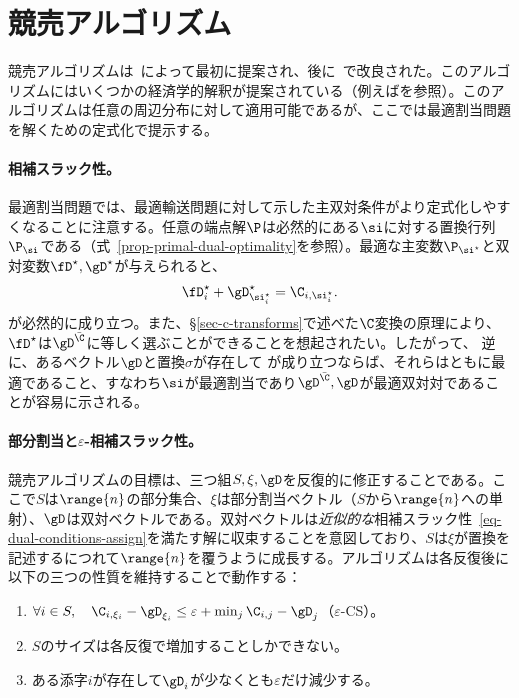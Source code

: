 \section{競売アルゴリズム}\label{s-auction}
競売アルゴリズムは~\citet{bertsekas1981new}によって最初に提案され、後に~\citep{bertsekas1988dual}で改良された。このアルゴリズムにはいくつかの経済学的解釈が提案されている（例えば\citet{bertsekas1992auction}を参照）。このアルゴリズムは任意の周辺分布に対して適用可能であるが、ここでは最適割当問題を解くための定式化で提示する。

\paragraph{相補スラック性。} 最適割当問題では、最適輸送問題に対して示した主双対条件がより定式化しやすくなることに注意する。任意の端点解$\P$は必然的にある$\si$に対する置換行列$\P_\si$である（式~\eqref{prop-primal-dual-optimality}を参照）。最適な主変数$\P_{\si^\star}$と双対変数$\fD^\star,\gD^\star$が与えられると、
$$
\fD^\star_i + \gD^\star_{\si^\star_i} = \C_{i,{\si_i^\star}}.
$$
が必然的に成り立つ。また、\S\ref{sec-c-transforms}で述べた$\C$変換の原理により、$\fD^\star$は$\gD^{\bar\C}$に等しく選ぶことができることを想起されたい。したがって、
逆に、あるベクトル$\gD$と置換$\sigma$が存在して
が成り立つならば、それらはともに最適であること、すなわち$\si$が最適割当であり$\gD^{\bar\C},\gD$が最適双対対であることが容易に示される。


\paragraph{部分割当と$\varepsilon$-相補スラック性。} 競売アルゴリズムの目標は、三つ組$S,\xi,\gD$を反復的に修正することである。ここで$S$は$\range{n}$の部分集合、$\xi$は部分割当ベクトル（$S$から$\range{n}$への単射）、$\gD$は双対ベクトルである。双対ベクトルは\emph{近似的な}相補スラック性~\eqref{eq-dual-conditions-assign}を満たす解に収束することを意図しており、$S$は$\xi$が置換を記述するにつれて$\range{n}$を覆うように成長する。アルゴリズムは各反復後に以下の三つの性質を維持することで動作する：
\begin{enumerate}[label={(\alph*)}]
	\item $\forall i\in S,\quad \C_{i,\xi_i} - \gD_{\xi_i}  \leq \varepsilon + \min_{j} \C_{i,j} - \gD_{j}$（$\varepsilon$-CS）。
	\item $S$のサイズは各反復で増加することしかできない。
	\item ある添字$i$が存在して$\gD_i$が少なくとも$\varepsilon$だけ減少する。
\end{enumerate}

